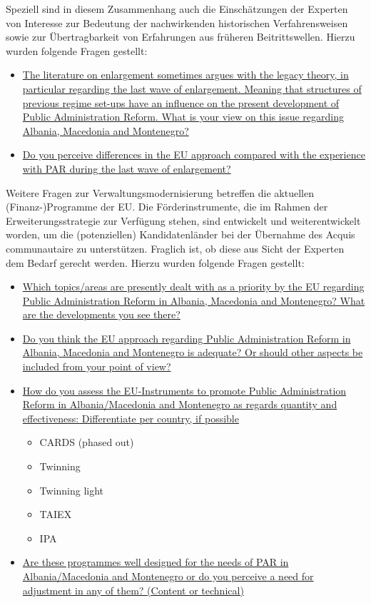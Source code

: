 Speziell sind in diesem Zusammenhang auch die Einschätzungen der Experten von Interesse zur Bedeutung der nachwirkenden historischen Verfahrensweisen sowie zur Übertragbarkeit von Erfahrungen aus früheren Beitrittswellen. Hierzu wurden folgende Fragen gestellt:
\begin{itemize}[label={}]
\item \ul{The literature on enlargement sometimes argues with the legacy theory, in particular regarding the last wave of enlargement. Meaning that structures of previous regime set-ups have an influence on the present development of Public Administration Reform. What is your view on this issue regarding Albania, Macedonia and Montenegro?}
\item \ul{Do you perceive differences in the EU approach compared with the experience with PAR during the last wave of enlargement?}
\end{itemize}
Weitere Fragen zur Verwaltungsmodernisierung betreffen die aktuellen (Finanz-)Programme der EU. Die Förderinstrumente, die im Rahmen der Erweiterungsstrategie zur Verfügung stehen, sind entwickelt und weiterentwickelt worden, um die (potenziellen) Kandidatenländer bei der Übernahme des Acquis communautaire zu unterstützen. Fraglich ist, ob diese aus Sicht der Experten dem Bedarf gerecht werden. Hierzu wurden folgende Fragen gestellt:
\begin{itemize}[label={}]
\item \ul{Which topics/areas are presently dealt with as a priority by the EU regarding Public Administration Reform in Albania, Macedonia and Montenegro? What are the developments you see there?}
\item \ul{Do you think the EU approach regarding Public Administration Reform in Albania, Macedonia and Montenegro is adequate? Or should other aspects be included from your point of view?}
\item \ul{How do you assess the EU-Instruments to promote Public Administration Reform in Albania/Macedonia and Montenegro as regards quantity and effectiveness:
Differentiate per country, if possible}
\begin{itemize}
\item CARDS (phased out)
\item Twinning
\item Twinning light
\item TAIEX
\item IPA
\end{itemize}
\item \ul{Are these programmes well designed for the needs of PAR in Albania/Macedonia and Montenegro or do you perceive a need for adjustment in any of them? (Content or technical)}
\end{itemize}

